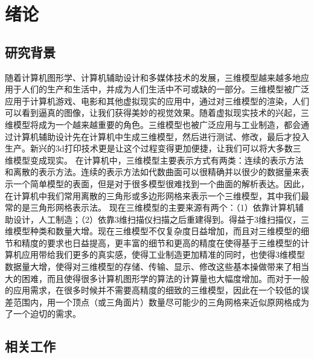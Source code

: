 

\chapter{绪论}

\section{研究背景}
随着计算机图形学、计算机辅助设计和多媒体技术的发展，三维模型越来越多地应用于人们的生产和生活中，并成为人们生活中不可或缺的一部分。三维模型被广泛应用于计算机游戏、电影和其他虚拟现实的应用中，通过对三维模型的渲染，人们可以看到逼真的图像，让我们获得美妙的视觉效果。随着虚拟现实技术的兴起，三维模型将成为一个越来越重要的角色。三维模型也被广泛应用与工业制造，都会通过计算机辅助设计先在计算机中生成三维模型，然后进行测试、修改，最后才投入生产。新兴的3d打印技术更是让这个过程变得更加便捷，让我们可以将大多数三维模型变成现实。
在计算机中，三维模型主要表示方式有两类：连续的表示方法和离散的表示方法。连续的表示方法如代数曲面可以很精确并以很少的数据量来表示一个简单模型的表面，但是对于很多模型很难找到一个曲面的解析表达。因此，在计算机中我们常用离散的三角形或多边形网格来表示一个三维模型，其中我们最常的是三角形网格表示法。
现在三维模型的主要来源有两个：（1）依靠计算机辅助设计，人工制造；（2）依靠3维扫描仪扫描之后重建得到。得益于3维扫描仪，三维模型种类和数量大增。现在三维模型不仅复杂度日益增加，而且对三维模型的细节和精度的要求也日益提高，更丰富的细节和更高的精度在使得基于三维模型的计算机应用带给我们更多的真实感，使得工业制造更加精准的同时，也使得3维模型数据量大增，使得对三维模型的存储、传输、显示、修改这些基本操做带来了相当大的困难，而且使得很多计算机图形学的算法的计算量也大幅度增加。而对于一般的应用需求，在很多时候并不需要高精度的细致的三维模型，因此在一个较低的误差范围内，用一个顶点（或三角面片）数量尽可能少的三角网格来近似原网格成为了一个迫切的需求。


\section{相关工作}

